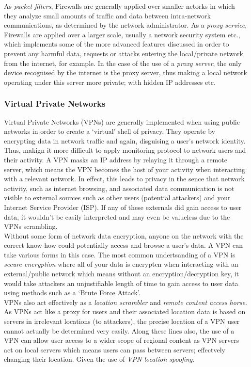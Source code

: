 \documentclass[11pt, english]{article}
\begin{document}
	As \textit{packet filters}, Firewalls are generally applied over smaller netorks in which they analyze small amounts of traffic and data between intra-network communications, as determined by the network administrator. As a \textit{proxy service}, Firewalls are applied over a larger scale, usually a network security system etc., which implements some of the more advanced features discussed in order to prevent any harmful data, requests or attacks entering the local/private network from the internet, for example. In the case of the use of a \textit{proxy server}, the only device recognised by the internet is the proxy server, thus making a local network operating under this server more private; with hidden IP addresses etc.

		\subsubsection{Virtual Private Networks}

	Virtual Private Networks (VPNs) are generally implemented when using public networks in order to create a `virtual' shell of privacy. They operate by encrypting data in network traffic and again, disguising a user's network identity. Thus, makign it more difficult to apply monitoring protocol to network users and their activity. A VPN masks an IP address by relaying it through a remote server, which means the VPN becomes the host of your activity when interacting with a relevant network. In effect, this leads to privacy in the sence that network activity, such as internet browsing, and associated data communication is not visible to external sources such as other users (potential attackers) and your Internet Service Provider (ISP). If any of these externals did gain access to user data, it wouldn't be easily interpreted and may even be valueless due to the VPNs scrambling.\\

	Without some form of network data encryption, anyone on the network with the correct know-how could potentially access and browse a user's data. A VPN can take various forms in this case. The most common undertsanding of a VPN is \textit{secure encryption} where all of your data is encrypten when interacting with an external/public network which means without an encryption/decryption key, it would take attackers an unjustifiable length of time to gain access to user data using methods such as a `Brute Force Attack'.\\

	VPNs also act effectively as a \textit{location scrambler} and \textit{remote content access horse}. As VPNs act like a proxy for users and their associated location data is based on servers in irrelevant locations (to attackers), the precise location of a VPN user cannot actually be determined very easily. Along these lines also, the use of a VPN can allow user access to a wider scope of regional content as VPN servers act on local servers which means users can pass between servers; effectvely changing their location. Given the use of \textit{VPN location spoofing}.\\
\end{document}
